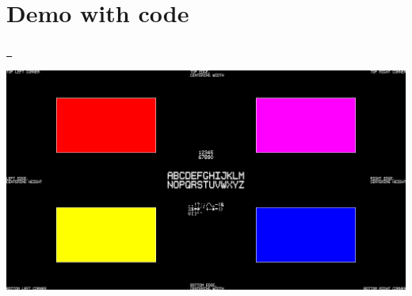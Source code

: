 \chapter{Demo with code}
\hypertarget{md__d_1_2home_2desktop_2github_2shgui_2docs_2src_2demo}{}\label{md__d_1_2home_2desktop_2github_2shgui_2docs_2src_2demo}
\label{md__d_1_2home_2desktop_2github_2shgui_2docs_2src_2demo_autotoc_md7}%
%
  \href{https://github.com/mrsinho/shgui}{\texttt{ }}

 
\begin{DoxyImageNoCaption}
  \mbox{\includegraphics[width=\textwidth,height=\textheight/2,keepaspectratio=true]{shgui-demo.png}}
\end{DoxyImageNoCaption}
   


